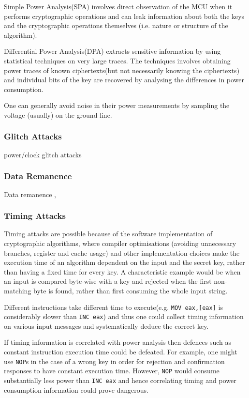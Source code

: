 \documentclass[10pt,journal,compsoc]{IEEEtran}
\begin{document}
	Simple Power Analysis(SPA) involves direct observation of the MCU when it performs cryptographic operations and can leak information about both the keys and the cryptographic operations themselves (i.e. nature or structure of the algorithm). 

	Differential Power Analysis(DPA) extracts sensitive information by using statistical techniques on very large traces. The techniques involves obtaining power traces of known ciphertexts(but not necessarily knowing the ciphertexts) and individual bits of the key are recovered by analysing the differences in power consumption\citep{kocher:DPA}.
	
	One can generally avoid noise in their power measurements by sampling the voltage (usually) on the ground line.
	\subsubsection{Glitch Attacks}
	power/clock glitch attacks
	\subsubsection{Data Remanence}
	Data remanence \citep{anderson:tamper_resistance}\citep{gutman:memory_remanence},
	\subsubsection{Timing Attacks}
	Timing attacks are possible because of the software implementation of cryptographic algorithms, where compiler optimisations (avoiding unnecessary branches, register and cache usage) and other implementation choices make the execution time of an algorithm dependent on the input and the secret key, rather than having a fixed time for every key. A characteristic example would be when an input is compared byte-wise with a key and rejected when the first non-matching byte is found, rather than first consuming the whole input string.
	
	Different instructions take different time to execute(e.g. \texttt{MOV eax,[eax]} is considerably slower than \texttt{INC eax}) and thus one could collect timing information on various input messages and systematically deduce the correct key. 
	
	If timing information is correlated with power analysis then defences such as constant instruction execution time could be defeated. For example, one might use \texttt{NOP}s in the case of a wrong key in order for rejection and confirmation responses to have constant execution time. However, \texttt{NOP} would consume substantially less power than \texttt{INC eax} and hence correlating timing and power consumption information could prove dangerous.
\end{document}
